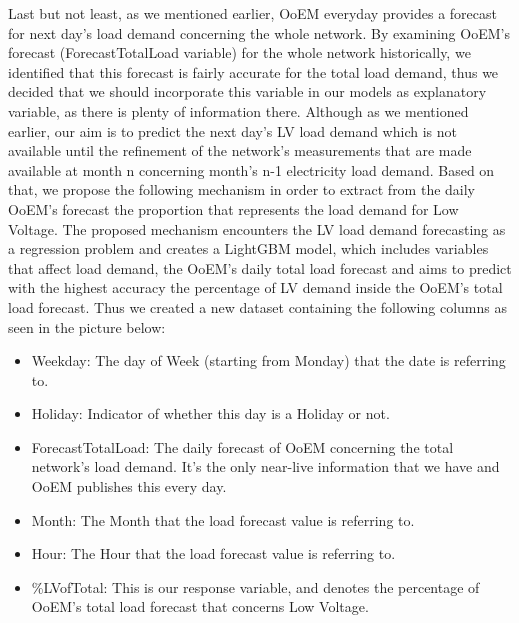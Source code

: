 \par Last but not least, as we mentioned earlier, OoEM everyday provides a forecast for next day's load demand concerning the whole network. By examining OoEM's forecast (ForecastTotalLoad variable) for the whole network historically, we identified that this forecast is fairly accurate for the total load demand, thus we decided that we should incorporate this variable in our models as explanatory variable, as there is plenty of information there.  Although as we mentioned earlier, our aim is to predict the next day's LV load demand which is not available until the refinement of the network's measurements that are made available at month n concerning month's n-1 electricity load demand. Based on that, we propose the following mechanism in order to extract from the daily OoEM's forecast the proportion that represents the load demand for Low Voltage. The proposed mechanism encounters the LV load demand forecasting as a regression problem and creates a LightGBM model, which includes variables that affect load demand, the OoEM's daily total load forecast and aims to predict with the highest accuracy the percentage of LV demand inside the OoEM's total load forecast. Thus we created a new dataset containing the following columns as seen in the picture below:
\begin{itemize}
    \item Weekday: The day of Week (starting from Monday) that the date is referring to.
    \item Holiday: Indicator of whether this day is a Holiday or not.
    \item ForecastTotalLoad: The daily forecast of OoEM concerning the total network's load demand. It's the only near-live information that we have and OoEM publishes this every day. 
    \item Month: The Month that the load forecast value is referring to.
    \item Hour: The Hour that the load forecast value is referring to.
    \item \%LVofTotal: This is our response variable, and denotes the percentage of OoEM's total load forecast that concerns Low Voltage. 
\end{itemize}

